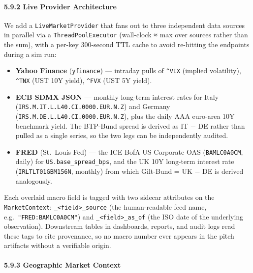 \documentclass[
]{article}
\providecommand{\tightlist}{%
  \setlength{\itemsep}{0pt}\setlength{\parskip}{0pt}}
\begin{document}
\paragraph{5.9.2 Live Provider
Architecture}\label{live-provider-architecture}

We add a \texttt{LiveMarketProvider} that fans out to three independent
data sources in parallel via a \texttt{ThreadPoolExecutor} (wall-clock ≈
max over sources rather than the sum), with a per-key 300-second TTL
cache to avoid re-hitting the endpoints during a sim run:

\begin{itemize}
\tightlist
\item
  \textbf{Yahoo Finance} (\texttt{yfinance}) --- intraday pulls of
  \texttt{\^{}VIX} (implied volatility), \texttt{\^{}TNX} (UST 10Y
  yield), \texttt{\^{}FVX} (UST 5Y yield).
\item
  \textbf{ECB SDMX JSON} --- monthly long-term interest rates for Italy
  (\texttt{IRS.M.IT.L.L40.CI.0000.EUR.N.Z}) and Germany
  (\texttt{IRS.M.DE.L.L40.CI.0000.EUR.N.Z}), plus the daily AAA
  euro-area 10Y benchmark yield. The BTP-Bund spread is derived as IT −
  DE rather than pulled as a single series, so the two legs can be
  independently audited.
\item
  \textbf{FRED} (St.~Louis Fed) --- the ICE BofA US Corporate OAS
  (\texttt{BAMLC0A0CM}, daily) for \texttt{US.base\_spread\_bps}, and
  the UK 10Y long-term interest rate (\texttt{IRLTLT01GBM156N}, monthly)
  from which Gilt-Bund = UK − DE is derived analogously.
\end{itemize}

Each overlaid macro field is tagged with two sidecar attributes on the
\texttt{MarketContext}:
\texttt{\_\textless{}field\textgreater{}\_source} (the human-readable
feed name, e.g.~\texttt{"FRED:BAMLC0A0CM"}) and
\texttt{\_\textless{}field\textgreater{}\_as\_of} (the ISO date of the
underlying observation). Downstream tables in dashboards, reports, and
audit logs read these tags to cite provenance, so no macro number ever
appears in the pitch artifacts without a verifiable origin.

\paragraph{5.9.3 Geographic Market
Context}\label{geographic-market-context}
\end{document}
